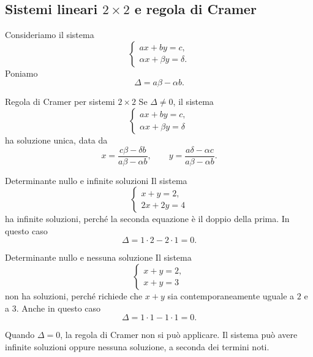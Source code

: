 \documentclass[a4paper]{article}
\begin{document}
\subsection{Sistemi lineari \(2\times 2\) e regola di Cramer}

Consideriamo il sistema
\[
    \begin{cases}
        ax+by=c,\\
        \alpha x+\beta y=\delta.
    \end{cases}
\]
Poniamo
\[
    \Delta = a\beta-\alpha b.
\]

\begin{snippettheorem}{Regola di Cramer per sistemi \(2\times 2\)}
    Se \(\Delta\neq 0\), il sistema
    \[
        \begin{cases}
            ax+by=c,\\
            \alpha x+\beta y=\delta
        \end{cases}
    \]
    ha soluzione unica, data da
    \[
        x=\frac{c\beta-\delta b}{a\beta-\alpha b},
        \qquad
        y=\frac{a\delta-\alpha c}{a\beta-\alpha b}.
    \]
\end{snippettheorem}

\begin{snippetexample}{Determinante nullo e infinite soluzioni}
    Il sistema
    \[
        \begin{cases}
            x+y=2,\\
            2x+2y=4
        \end{cases}
    \]
    ha infinite soluzioni, perché la seconda equazione è il doppio della prima. In questo caso
    \[
        \Delta = 1\cdot 2-2\cdot 1=0.
    \]
\end{snippetexample}

\begin{snippetexample}{Determinante nullo e nessuna soluzione}
    Il sistema
    \[
        \begin{cases}
            x+y=2,\\
            x+y=3
        \end{cases}
    \]
    non ha soluzioni, perché richiede che \(x+y\) sia contemporaneamente uguale a \(2\) e a \(3\). Anche in questo caso
    \[
        \Delta = 1\cdot 1-1\cdot 1=0.
    \]
\end{snippetexample}

Quando \(\Delta=0\), la regola di Cramer non si può applicare. Il sistema può avere infinite soluzioni oppure nessuna soluzione, a seconda dei termini noti.
\end{document}
